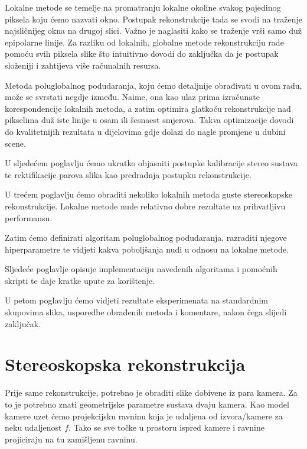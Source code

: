 \documentclass[utf8, zavrsni, numeric]{fer}
\begin{document}
Lokalne metode se temelje na promatranju lokalne okoline svakog pojedinog piksela koju ćemo nazvati okno.
Postupak rekonstrukcije tada se svodi na traženje najsličnijeg okna na drugoj slici. Važno je naglasiti kako se traženje vrši samo duž epipolarne linije.
Za razliku od lokalnih, globalne metode rekonstrukciju rade pomoću svih piksela slike što intuitivno dovodi do zaključka da je postupak složeniji i zahtijeva više računalnih resursa.

Metoda poluglobalnog podudaranja, koju ćemo detaljnije obrađivati u ovom radu, može se svrstati negdje između. Naime, ona kao ulaz prima izračunate korespondencije lokalnih metoda, a zatim optimira glatkoću rekonstrukcije nad pikselima duž iste linije u osam ili šesnaest smjerova.
Takva optimizacije dovodi do kvalitetnijih rezultata u dijelovima gdje dolazi do nagle promjene u dubini scene.

U sljedećem poglavlju ćemo ukratko objasniti postupke kalibracije stereo sustava te rektifikacije parova slika kao predradnja postupku rekonstrukcije.

U trećem poglavlju ćemo obraditi nekoliko lokalnih metoda guste stereoskopske rekonstrukcije. Lokalne metode nude relativno dobre rezultate uz prihvatljivu performansu.

Zatim ćemo definirati algoritam poluglobalnog podudaranja, razraditi njegove hiperparametre te vidjeti kakva poboljšanja nudi u odnosu na lokalne metode.

Sljedeće poglavlje opisuje implementaciju navedenih algoritama i pomoćnih skripti te daje kratke upute za korištenje.

U petom poglavlju ćemo vidjeti rezultate eksperimenata na standardnim skupovima slika, usporedbe obrađenih metoda i komentare, nakon čega slijedi zaključak.

\chapter{Stereoskopska rekonstrukcija}

Prije same rekonstrukcije, potrebno je obraditi slike dobivene iz para kamera. Za to je potrebno znati geometrijske parametre sustava dvaju kamera. Kao model kamere uzet ćemo
projekcijsku ravninu koja je udaljena od izvora/kamere za neku udaljenost $f$. Tako se sve točke u prostoru ispred kamere i ravnine projiciraju na tu zamišljenu ravninu.
\end{document}
